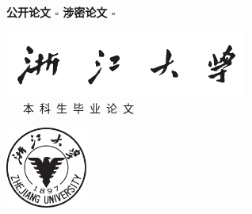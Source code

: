 {

    \fangsong \wuhao \bfseries
    \hfill 公开论文 $\square$ \quad 涉密论文 $\square$ \quad \quad \quad
    \bfseries
    \heiti
    \xiaoyi
    \vspace*{10pt}
    \begin{center}
        \includegraphics[width=0.6\textwidth]{figure/zjuchar.pdf} \\
        \vspace{1em}
        ~~~本~科~生~毕~业~论~文~~~
        \vspace{1em}
    \end{center}

    \begin{center}
        \includegraphics[width=0.2\textwidth]{figure/zjulogo.pdf}
    \end{center}

    \sanhao
    \setlength\extrarowheight{1em}
    \fangsong
    \begin{center}
        \linespread{1}\selectfont
        \newlength{\titwidth}
        \newlength{\tablewidth}
        \newlength{\realtablewidth}


\end{center}}
